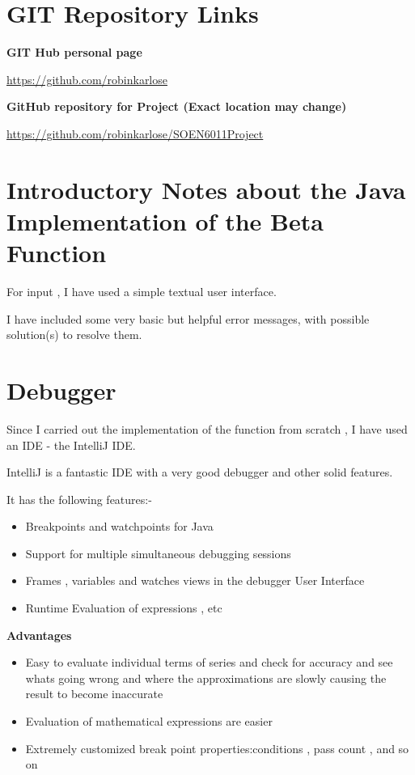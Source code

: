 \documentclass[12pt,letterpaper]{article}
\begin{document}
\section*{GIT Repository Links}

\textbf{GIT Hub personal page}

\url{https://github.com/robinkarlose}

\textbf{GitHub repository for Project (Exact location may change)}

\url{https://github.com/robinkarlose/SOEN6011Project}


\section*{Introductory Notes about the Java Implementation of the Beta Function}

For input , I have used a simple textual user interface.


I have included some very basic but helpful error messages, with possible solution(s) to resolve them.



\section*{Debugger}

Since I carried out the implementation of the function from scratch , I have used an IDE - the IntelliJ IDE. 

IntelliJ is a fantastic IDE with a very good debugger and other solid features.

It has the following features:-
\begin{itemize}
\item{Breakpoints and watchpoints for Java}
\item{Support for multiple simultaneous debugging sessions}
\item{Frames , variables and watches views in the debugger User Interface}
\item{Runtime Evaluation of expressions , etc}
\end{itemize}

\textbf{Advantages}

\begin{itemize}
\item{Easy to evaluate individual terms of series and check for accuracy and see whats going wrong and where the approximations are slowly causing the result to become inaccurate}
\item{Evaluation of mathematical expressions are easier}
\item{Extremely customized break point properties:conditions , pass count , and so on }
\end{itemize}
\end{document}
